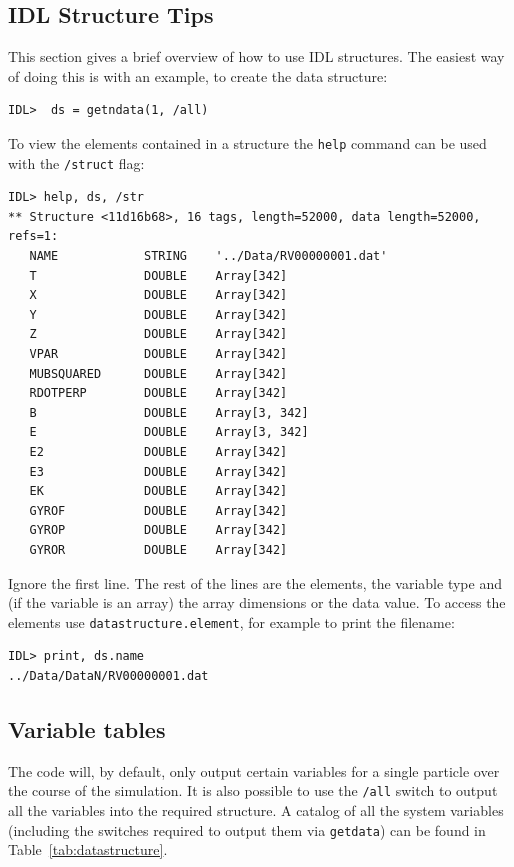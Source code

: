 \documentclass[a4paper,11pt,usenames,dvipsnames]{article}
\begin{document}
\subsection{IDL Structure Tips}\label{subsec:IDLtips}
This section gives a brief overview of how to use IDL structures. The easiest way of doing this is with an example, to create the data structure:
\begin{verbatim}
IDL>  ds = getndata(1, /all)
\end{verbatim}
To view the elements contained in a structure the \texttt{help} command can be used with the \texttt{/struct} flag:
\begin{verbatim}
IDL> help, ds, /str
** Structure <11d16b68>, 16 tags, length=52000, data length=52000, refs=1:
   NAME            STRING    '../Data/RV00000001.dat'
   T               DOUBLE    Array[342]
   X               DOUBLE    Array[342]
   Y               DOUBLE    Array[342]
   Z               DOUBLE    Array[342]
   VPAR            DOUBLE    Array[342]
   MUBSQUARED      DOUBLE    Array[342]
   RDOTPERP        DOUBLE    Array[342]
   B               DOUBLE    Array[3, 342]
   E               DOUBLE    Array[3, 342]
   E2              DOUBLE    Array[342]
   E3              DOUBLE    Array[342]
   EK              DOUBLE    Array[342]
   GYROF           DOUBLE    Array[342]
   GYROP           DOUBLE    Array[342]
   GYROR           DOUBLE    Array[342]
\end{verbatim}
Ignore the first line. The rest of the lines are the elements, the variable type and (if the variable is an array) the array dimensions or the data value. 
To access the elements use \texttt{datastructure.element}, for example to print the filename:
\begin{verbatim}
IDL> print, ds.name
../Data/DataN/RV00000001.dat
\end{verbatim}

\subsection{Variable tables}
The code will, by default, only output certain variables for a single particle over the course of the simulation. It is also possible to use the \texttt{/all} switch to output all the variables into the required structure. A catalog of all the system variables (including the switches required to output them via \texttt{getdata}) can be found in Table~\ref{tab:datastructure}.
\end{document}
